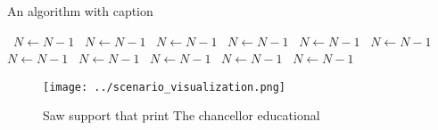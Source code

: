 \documentclass[a4paper]{article}
\begin{document}
\begin{algorithm}
\caption{An algorithm with caption}
\begin{algorithmic}
\    \State $N \gets N - 1$
\    \State $N \gets N - 1$
\    \State $N \gets N - 1$
\    \State $N \gets N - 1$
\    \State $N \gets N - 1$
\    \State $N \gets N - 1$
\    \State $N \gets N - 1$
\    \State $N \gets N - 1$
\    \State $N \gets N - 1$
\    \State $N \gets N - 1$
\    \State $N \gets N - 1$
\EndWhile
\end{algorithmic}
\end{algorithm}

\begin{figure}
\centering
\texttt{[image: ../scenario\_visualization.png]}
\caption{Saw support that print The chancellor educational
}
\end{figure}
 
\end{document}
